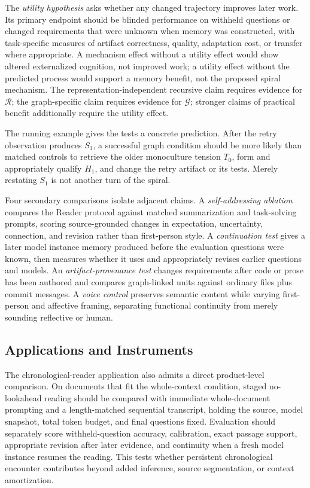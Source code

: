 The \emph{utility hypothesis} asks whether any changed trajectory improves later work. Its primary endpoint should be blinded performance on withheld questions or changed requirements that were unknown when memory was constructed, with task-specific measures of artifact correctness, quality, adaptation cost, or transfer where appropriate. A mechanism effect without a utility effect would show altered externalized cognition, not improved work; a utility effect without the predicted process would support a memory benefit, not the proposed spiral mechanism. The representation-independent recursive claim requires evidence for $\mathcal{R}$; the graph-specific claim requires evidence for $\mathcal{G}$; stronger claims of practical benefit additionally require the utility effect.

The running example gives the tests a concrete prediction. After the retry observation produces $S_1$, a successful graph condition should be more likely than matched controls to retrieve the older monoculture tension $T_0$, form and appropriately qualify $H_1$, and change the retry artifact or its tests. Merely restating $S_1$ is not another turn of the spiral.

Four secondary comparisons isolate adjacent claims. A \emph{self-addressing ablation} compares the Reader protocol against matched summarization and task-solving prompts, scoring source-grounded changes in expectation, uncertainty, connection, and revision rather than first-person style. A \emph{continuation test} gives a later model instance memory produced before the evaluation questions were known, then measures whether it uses and appropriately revises earlier questions and models. An \emph{artifact-provenance test} changes requirements after code or prose has been authored and compares graph-linked units against ordinary files plus commit messages. A \emph{voice control} preserves semantic content while varying first-person and affective framing, separating functional continuity from merely sounding reflective or human.

\subsection{Applications and Instruments}

The chronological-reader application also admits a direct product-level comparison. On documents that fit the whole-context condition, staged no-lookahead reading should be compared with immediate whole-document prompting and a length-matched sequential transcript, holding the source, model snapshot, total token budget, and final questions fixed. Evaluation should separately score withheld-question accuracy, calibration, exact passage support, appropriate revision after later evidence, and continuity when a fresh model instance resumes the reading. This tests whether persistent chronological encounter contributes beyond added inference, source segmentation, or context amortization.

